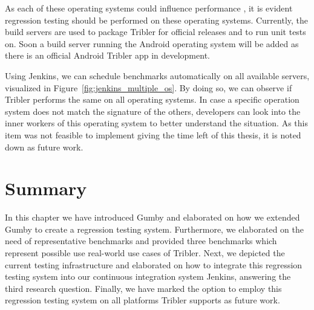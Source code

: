 As each of these operating systems could influence performance \cite{gupta1991impact}, it is evident regression testing should be performed on these operating systems.
Currently, the build servers are used to package Tribler for official releases and to run unit tests on.
Soon a build server running the Android operating system will be added as there is an official Android Tribler app in development.

Using Jenkins, we can schedule benchmarks automatically on all available servers, visualized in Figure~\ref{fig:jenkins_multiple_os}.
By doing so, we can observe if Tribler performs the same on all operating systems.
In case a specific operation system does not match the signature of the others, developers can look into the inner workers of this operating system to better understand the situation.
As this item was not feasible to implement giving the time left of this thesis, it is noted down as future work.

\section{Summary}

In this chapter we have introduced Gumby and elaborated on how we extended Gumby to create a regression testing system.
Furthermore, we elaborated on the need of representative benchmarks and provided three benchmarks which represent possible use real-world use cases of Tribler.
Next, we depicted the current testing infrastructure and elaborated on how to integrate this regression testing system into our continuous integration system Jenkins, answering the third research question.
Finally, we have marked the option to employ this regression testing system on all platforms Tribler supports as future work.
